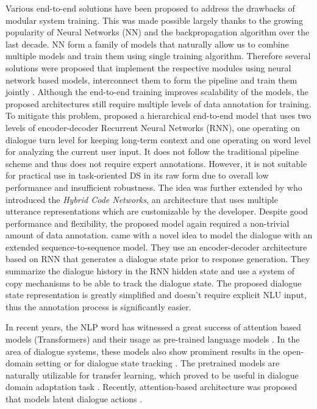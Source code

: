 Various end-to-end solutions have been proposed to address the drawbacks of modular system training.
This was made possible largely thanks to the growing popularity of Neural Networks (NN) and the backpropagation algorithm over the last decade.
NN form a family of models that naturally allow us to combine multiple models and train them using single training algorithm.
Therefore several solutions were proposed that implement the respective modules using neural network based models, interconnect them to form the pipeline and train them jointly \cite{li-etal-2017-end,wen-etal-2017-network}.
Although the end-to-end training improves scalability of the models, the proposed architectures still require multiple levels of data annotation for training.
To mitigate this problem, \citet{serban2016building} proposed a hierarchical end-to-end model that uses two levels of encoder-decoder Recurrent Neural Networks (RNN), one operating on dialogue turn level for keeping long-term context and one operating on word level for analyzing the current user input.
It does not follow the traditional pipeline scheme and thus does not require expert annotations.
However, it is not suitable for practical use in task-oriented DS in its raw form due to overall low performance and insufficient robustness.
The idea was further extended by \citet{williams2017hybrid} who introduced the \textit{Hybrid Code Networks}, an architecture that uses multiple utterance representations which are customizable by the developer.
Despite good performance and flexibility, the proposed model again required a non-trivial amount of data annotation.
\citet{lei2018sequicity} came with a novel idea to model the dialogue with an extended sequence-to-sequence model.
\label{sec:sequicity}
They use an encoder-decoder architecture based on RNN that generates a dialogue state prior to response generation.
They summarize the dialogue history in the RNN hidden state and use a system of copy mechanisms to be able to track the dialogue state.
The proposed dialogue state representation is greatly simplified and doesn't require explicit NLU input, thus the annotation process is significantly easier.

In recent years, the NLP word has witnessed a great success of attention based models (Transformers) \cite{vaswani2017attention} and their usage as pre-trained language models \cite{devlin-etal-2019-bert}.
In the area of dialogue systems, these models also show prominent results in the open-domain setting \cite{DBLP:journals/corr/abs-1901-08149} or for dialogue state tracking \cite{chao2019bert}.
The pretrained models are naturally utilizable for transfer learning, which proved to be useful in dialogue domain adaptation task \cite{shalyminov-etal-2019-shot}.
Recently, attention-based architecture was proposed that models latent dialogue actions \cite{bao2019plato}.

